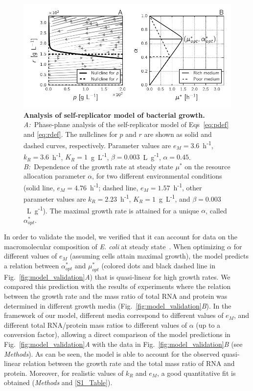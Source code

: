 \begin{figure}[tb]
\includegraphics[width=\textwidth]{./Fig/Fig2}
\caption{\textbf{Analysis of self-replicator model of bacterial growth.}
\textit{A:}~Phase-plane analysis of the self-replicator model of Eqs~\ref{eq:pdef} and \ref{eq:rdef}.
The nullclines for $p$ and $r$ are shown as solid and dashed curves, respectively.
Parameter values are $e_M = 3.6$~h\textsuperscript{-1}, $k_R = 3.6$~h\textsuperscript{-1}, $K_R=1$~g~L\textsuperscript{-1}, $\beta = 0.003$~L~g\textsuperscript{-1}, $\alpha = 0.45$.
\textit{B:}~Dependence of the growth rate at steady state $\mu^{*}$ on the resource allocation parameter $\alpha$, for two different environmental conditions (solid line, $e_M = 4.76$~h\textsuperscript{-1}; dashed line, $e_M = 1.57$~h\textsuperscript{-1}, other parameter values are $k_R = 2.23$~h\textsuperscript{-1}, $K_R=1$~g~L\textsuperscript{-1}, and $\beta = 0.003$~L~g\textsuperscript{-1}).
The maximal growth rate is attained for a unique $\alpha$, called $\alpha^*_{opt}$.
}
\label{fig:model_analysis}
\end{figure}

In order to validate the model, we verified that it can account for data on the macromolecular composition of \textit{E. coli} at steady state~\cite{scott_interdependence_2010}.
When optimizing $\alpha$ for different values of $e_M$ (assuming cells attain maximal growth), the model predicts a relation between $\alpha^*_{opt}$ and $\mu^*_{opt}$ (colored dots and black dashed line in Fig.~\ref{fig:model_validation}\textit{A}) that is quasi-linear for high growth rates.
We compared this prediction with the results of experiments where the relation between the growth rate and the mass ratio of total RNA and protein was determined in different growth media (Fig.~\ref{fig:model_validation}\textit{B}).
In the framework of our model, different media correspond to different values of $e_M$, and different total RNA/protein mass ratios to different values of $\alpha$ (up to a conversion factor), allowing a direct comparison of the model predictions in Fig.~\ref{fig:model_validation}\textit{A} with the data in Fig.~\ref{fig:model_validation}\textit{B} (see \textit{Methods}).
As can be seen, the model is able to account for the observed quasi-linear relation between the growth rate and the total mass ratio of RNA and protein. 
Moreover, for realistic values of $k_R$ and $e_M$, a good quantitative fit is obtained (\textit{Methods} and \ref{S1_Table}).

